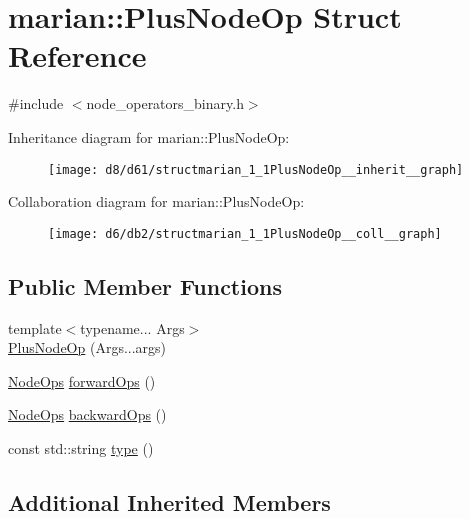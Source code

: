 \hypertarget{structmarian_1_1PlusNodeOp}{}\section{marian\+:\+:Plus\+Node\+Op Struct Reference}
\label{structmarian_1_1PlusNodeOp}


{\ttfamily \#include $<$node\+\_\+operators\+\_\+binary.\+h$>$}



Inheritance diagram for marian\+:\+:Plus\+Node\+Op\+:
\nopagebreak
\begin{figure}[H]
\begin{center}
\leavevmode
\texttt{[image: d8/d61/structmarian\_1\_1PlusNodeOp\_\_inherit\_\_graph]}
\end{center}
\end{figure}


Collaboration diagram for marian\+:\+:Plus\+Node\+Op\+:
\nopagebreak
\begin{figure}[H]
\begin{center}
\leavevmode
\texttt{[image: d6/db2/structmarian\_1\_1PlusNodeOp\_\_coll\_\_graph]}
\end{center}
\end{figure}
\subsection*{Public Member Functions}
\begin{DoxyCompactItemize}
\item 
{\footnotesize template$<$typename... Args$>$ }\\\hyperlink{structmarian_1_1PlusNodeOp_a56a714f9584ec9bc3d1960d0dfd90f4b}{Plus\+Node\+Op} (Args...\+args)
\item 
\hyperlink{namespacemarian_a4956376218cc236016c20bc4071470da}{Node\+Ops} \hyperlink{structmarian_1_1PlusNodeOp_a53ac7e34d662a37cea8b27e1fed496dc}{forward\+Ops} ()
\item 
\hyperlink{namespacemarian_a4956376218cc236016c20bc4071470da}{Node\+Ops} \hyperlink{structmarian_1_1PlusNodeOp_a3a9f5aac6cb519bc00c7cd916d458859}{backward\+Ops} ()
\item 
const std\+::string \hyperlink{structmarian_1_1PlusNodeOp_a15c5a3a64a20a33d8429c620eaebc503}{type} ()
\end{DoxyCompactItemize}
\subsection*{Additional Inherited Members}


